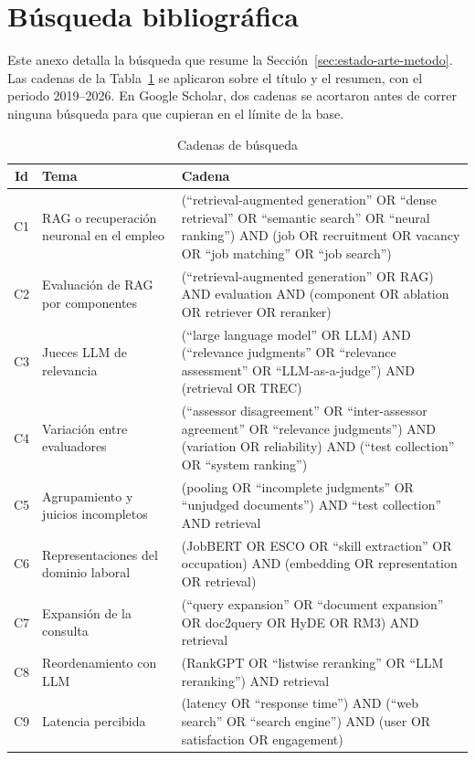 \section{Búsqueda bibliográfica}
\label{anx:busqueda}

Este anexo detalla la búsqueda que resume la Sección~\ref{sec:estado-arte-metodo}. Las cadenas de la Tabla~\ref{tab:anx-cadenas} se aplicaron sobre el título y el resumen, con el periodo 2019--2026. En Google Scholar, dos cadenas se acortaron antes de correr ninguna búsqueda para que cupieran en el límite de la base.

\begin{table}[htbp!]
    \centering
    \caption{Cadenas de búsqueda}
    \label{tab:anx-cadenas}
    \footnotesize
    \begin{tabular}{|c|>{\raggedright\arraybackslash}p{3.2cm}|>{\raggedright\arraybackslash}p{9.8cm}|}
        \hline
        \textbf{Id} & \textbf{Tema} & \textbf{Cadena} \\
        \hline
        C1 & RAG o recuperación neuronal en el empleo & (\enquote{retrieval-augmented generation} OR \enquote{dense retrieval} OR \enquote{semantic search} OR \enquote{neural ranking}) AND (job OR recruitment OR vacancy OR \enquote{job matching} OR \enquote{job search}) \\
        \hline
        C2 & Evaluación de RAG por componentes & (\enquote{retrieval-augmented generation} OR RAG) AND evaluation AND (component OR ablation OR retriever OR reranker) \\
        \hline
        C3 & Jueces LLM de relevancia & (\enquote{large language model} OR LLM) AND (\enquote{relevance judgments} OR \enquote{relevance assessment} OR \enquote{LLM-as-a-judge}) AND (retrieval OR TREC) \\
        \hline
        C4 & Variación entre evaluadores & (\enquote{assessor disagreement} OR \enquote{inter-assessor agreement} OR \enquote{relevance judgments}) AND (variation OR reliability) AND (\enquote{test collection} OR \enquote{system ranking}) \\
        \hline
        C5 & Agrupamiento y juicios incompletos & (pooling OR \enquote{incomplete judgments} OR \enquote{unjudged documents}) AND \enquote{test collection} AND retrieval \\
        \hline
        C6 & Representaciones del dominio laboral & (JobBERT OR ESCO OR \enquote{skill extraction} OR occupation) AND (embedding OR representation OR retrieval) \\
        \hline
        C7 & Expansión de la consulta & (\enquote{query expansion} OR \enquote{document expansion} OR doc2query OR HyDE OR RM3) AND retrieval \\
        \hline
        C8 & Reordenamiento con LLM & (RankGPT OR \enquote{listwise reranking} OR \enquote{LLM reranking}) AND retrieval \\
        \hline
        C9 & Latencia percibida & (latency OR \enquote{response time}) AND (\enquote{web search} OR \enquote{search engine}) AND (user OR satisfaction OR engagement) \\
        \hline
    \end{tabular}
\end{table}

